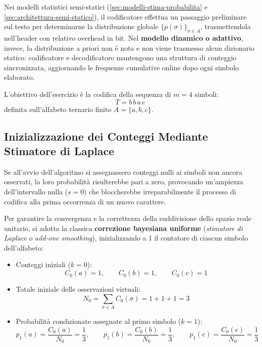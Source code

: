 Nei modelli statistici semi-statici (\autoref{sec:modelli-stima-probabilita} e \autoref{sec:architettura-semi-statico}), il codificatore effettua un passaggio preliminare sul testo per determinarne la distribuzione globale $\{p(\sigma)\}_{\sigma \in A}$, trasmettendola nell'header con relativo overhead in bit. Nel \textbf{modello dinamico o adattivo}, invece, la distribuzione a priori non \`e nota e non viene trasmesso alcun dizionario statico: codificatore e decodificatore mantengono una struttura di conteggio sincronizzata, aggiornando le frequenze cumulative online dopo ogni simbolo elaborato.

L'obiettivo dell'esercizio \`e la codifica della sequenza di $m = 4$ simboli:
\begin{equation}
  T = b\,b\,a\,c
\end{equation}
definita sull'alfabeto ternario finito $A = \{a, b, c\}$.

\FloatBarrier
\subsection{Inizializzazione dei Conteggi Mediante Stimatore di Laplace}
\label{subsec:inizializzazione-laplace}

Se all'avvio dell'algoritmo si assegnassero conteggi nulli ai simboli non ancora osservati, la loro probabilit\`a risulterebbe pari a zero, provocando un'ampiezza dell'intervallo nulla ($s = 0$) che bloccherebbe irreparabilmente il processo di codifica alla prima occorrenza di un nuovo carattere.

Per garantire la convergenza e la correttezza della suddivisione dello spazio reale unitario, si adotta la classica \textbf{correzione bayesiana uniforme} (\textit{stimatore di Laplace} o \textit{add-one smoothing}), inizializzando a 1 il contatore di ciascun simbolo dell'alfabeto:
\begin{itemize}
  \item Conteggi iniziali ($k = 0$):
  \begin{equation}
    C_0(a) = 1, \qquad C_0(b) = 1, \qquad C_0(c) = 1
  \end{equation}
  \item Totale iniziale delle osservazioni virtuali:
  \begin{equation}
    N_0 = \sum_{\sigma \in A} C_0(\sigma) = 1 + 1 + 1 = 3
  \end{equation}
  \item Probabilit\`a condizionate assegnate al primo simbolo ($k = 1$):
  \begin{equation}
    p_1(a) = \frac{C_0(a)}{N_0} = \frac{1}{3}, \qquad p_1(b) = \frac{C_0(b)}{N_0} = \frac{1}{3}, \qquad p_1(c) = \frac{C_0(c)}{N_0} = \frac{1}{3}
  \end{equation}
\end{itemize}

